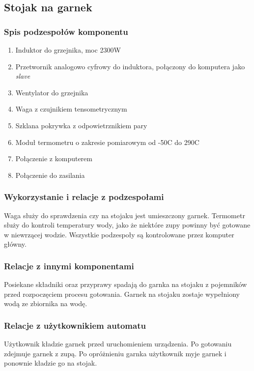\documentclass[12pt,a4paper,notitlepage]{article}
\begin{document}
\subsection{Stojak na garnek}
\subsubsection{Spis podzespołów komponentu}
\begin{enumerate}
  \item Induktor do grzejnika, moc 2300W
  \item Przetwornik analogowo cyfrowy do induktora, połączony do komputera jako \emph{slave}
  \item Wentylator do grzejnika
  \item Waga z czujnikiem tensometrycznym
  \item Szklana pokrywka z odpowietrznikiem pary
  \item Moduł termometru o zakresie pomiarowym od -50\degree C do 290\degree C
  \item Połączenie z komputerem
  \item Połączenie do zasilania
\end{enumerate}
 
\subsubsection{Wykorzystanie i relacje z podzespołami}
Waga służy do sprawdzenia czy na stojaku jest umieszczony garnek. Termometr służy do kontroli temperatury wody, jako że niektóre zupy powinny być gotowane w niewrzącej wodzie. Wszystkie podzespoły są kontrolowane przez komputer główny.

\subsubsection{Relacje z innymi komponentami}
Posiekane składniki oraz przyprawy spadają do garnka na stojaku z pojemników przed rozpoczęciem procesu gotowania. Garnek na stojaku zostaje wypełniony wodą ze zbiornika na wodę.

\subsubsection{Relacje z użytkownikiem automatu}
Użytkownik kładzie garnek przed uruchomieniem urządzenia. Po gotowaniu zdejmuje garnek z zupą. Po opróżnieniu garnka użytkownik myje garnek i ponownie kładzie go na stojak.
\end{document}
